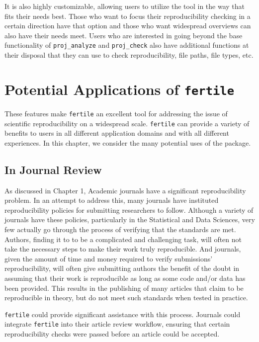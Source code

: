 \documentclass[12pt,twoside]{reedthesis}
\begin{document}
It is also highly customizable, allowing users to utilize the tool in the way that fits their needs best. Those who want to focus their reproducibility checking in a certain direction have that option and those who want widespread overviews can also have their needs meet. Users who are interested in going beyond the base functionality of \texttt{proj\_analyze} and \texttt{proj\_check} also have additional functions at their disposal that they can use to check reproducibility, file paths, file types, etc.

\hypertarget{potential-applications-of-fertile}{%
\section{\texorpdfstring{Potential Applications of \texttt{fertile}}{Potential Applications of fertile}}\label{potential-applications-of-fertile}}

These features make \texttt{fertile} an excellent tool for addressing the issue of scientific reproducibility on a widespread scale. \texttt{fertile} can provide a variety of benefits to users in all different application domains and with all different experiences. In this chapter, we consider the many potential uses of the package.

\hypertarget{in-journal-review}{%
\subsection{In Journal Review}\label{in-journal-review}}

As discussed in Chapter 1, Academic journals have a significant reproducibility problem. In an attempt to address this, many journals have instituted reproducibility policies for submitting researchers to follow. Although a variety of journals have these policies, particularly in the Statistical and Data Sciences, very few actually go through the process of verifying that the standards are met. Authors, finding it to to be a complicated and challenging task, will often not take the necessary steps to make their work truly reproducible. And journals, given the amount of time and money required to verify submissions' reproducibility, will often give submitting authors the benefit of the doubt in assuming that their work is reproducible as long as some code and/or data has been provided. This results in the publishing of many articles that claim to be reproducible in theory, but do not meet such standards when tested in practice.

\texttt{fertile} could provide significant assistance with this process. Journals could integrate \texttt{fertile} into their article review workflow, ensuring that certain reproducibility checks were passed before an article could be accepted.
\end{document}
